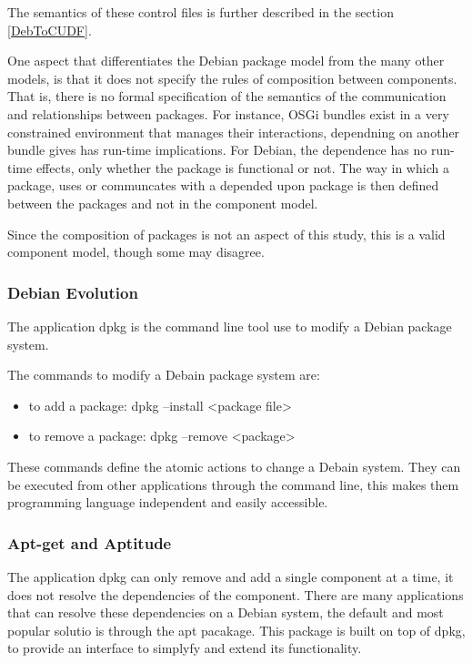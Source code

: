 The semantics of these control files is further described in the section \ref{DebToCUDF}.

One aspect that differentiates the Debian package model from the many other models, is that it does not specify the rules of composition between components.
That is, there is no formal specification of the semantics of the communication and relationships between packages.
For instance, OSGi bundles exist in a very constrained environment that manages their interactions, dependning on another bundle gives has run-time implications.
For Debian, the dependence has no run-time effects, only whether the package is functional or not.
The way in which a package, uses or communcates with a depended upon package is then defined between the packages and not in the component model.

Since the composition of packages is not an aspect of this study, this is a valid component model, though some may disagree.


\subsubsection{Debian Evolution}
The application dpkg is the command line tool use to modify a Debian package system.

The commands to modify a Debain package system are:
\begin{itemize}
  \item to add a package: dpkg --install <package file>
  \item to remove a package: dpkg --remove <package>
\end{itemize}

These commands define the atomic actions to change a Debain system.
They can be executed from other applications through the command line, this makes them programming language independent and easily accessible. 

\subsubsection{Apt-get and Aptitude}
The application dpkg can only remove and add a single component at a time, it does not resolve the dependencies of the component.
There are many applications that can resolve these dependencies on a Debian system, the default and most popular solutio is through the apt pacakage.
This package is built on top of dpkg, to provide an interface to simplyfy and extend its functionality.

